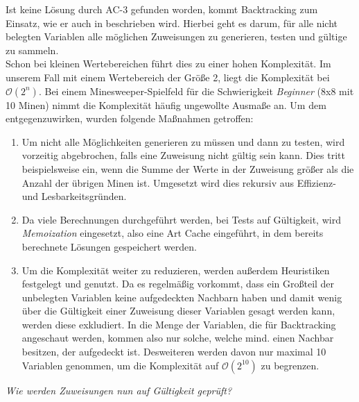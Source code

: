 Ist keine Lösung durch AC-3 gefunden worden, kommt Backtracking zum Einsatz, wie er auch in \cite{Alan} beschrieben wird. Hierbei geht es darum,
für alle nicht belegten Variablen alle möglichen Zuweisungen zu generieren, testen und gültige zu sammeln.\\ Schon bei kleinen Wertebereichen
führt dies zu einer hohen Komplexität. Im unserem Fall mit einem Wertebereich der Größe 2, liegt die Komplexität bei $\mathcal{O}(2^n)$.
Bei einem Minesweeper-Spielfeld für die Schwierigkeit \textit{Beginner} (8x8 mit 10 Minen) nimmt die Komplexität häufig ungewollte Ausmaße an.
Um dem entgegenzuwirken, wurden folgende Maßnahmen getroffen:
\begin{enumerate}
    \item Um nicht alle Möglichkeiten generieren zu müssen und dann zu testen, wird vorzeitig abgebrochen, falls eine Zuweisung nicht gültig sein
    kann. Dies tritt beispielsweise ein, wenn die Summe der Werte in der Zuweisung größer als die Anzahl der übrigen Minen ist. Umgesetzt wird
    dies rekursiv aus Effizienz- und Lesbarkeitsgründen.
    \item Da viele Berechnungen durchgeführt werden, bei Tests auf Gültigkeit, wird \textit{Memoization} eingesetzt, also eine Art Cache eingeführt,
    in dem bereits berechnete Lösungen gespeichert werden. 
    \item Um die Komplexität weiter zu reduzieren, werden außerdem Heuristiken festgelegt und genutzt. Da es regelmäßig vorkommt, dass ein
    Großteil der unbelegten Variablen keine aufgedeckten Nachbarn haben und damit wenig über die Gültigkeit einer Zuweisung dieser Variablen
    gesagt werden kann, werden diese exkludiert. In die Menge der Variablen, die für Backtracking angeschaut werden, kommen also nur solche,
    welche mind. einen Nachbar besitzen, der aufgedeckt ist. Desweiteren werden davon nur maximal 10 Variablen genommen, um die Komplexität
    auf $\mathcal{O}(2^{10})$ zu begrenzen.
\end{enumerate}

\textit{Wie werden Zuweisungen nun auf Gültigkeit geprüft?}


